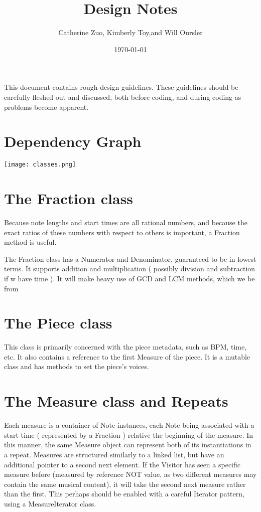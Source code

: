 \documentclass{amsart}
\begin{document}
\author{ Catherine Zuo, Kimberly Toy,and Will Oursler}
\title{Design Notes}
\date{\today}
\maketitle

This document contains rough design guidelines. These guidelines should be carefully fleshed out and discussed, both before coding, and during coding as problems become apparent.

\section{ Dependency Graph }

\texttt{[image: classes.png]}

\section{ The Fraction class }

Because note lengths and start times are all rational numbers, and because the exact ratios of these numbers with respect to others is important, a Fraction method is useful.

The Fraction class has a Numerator and Denominator, guaranteed to be in lowest terms. It supports addition and multiplication ( possibly division and subtraction if w have time ). It will make heavy use of GCD and LCM methods, which we be from %

\section{ The Piece class }

This class is primarily concerned with the piece metadata, such as BPM, time, etc. It also contains a reference to the first Measure of the piece.  It is a mutable class and has methods to set the piece's voices.  

\section{ The Measure class and Repeats }

Each measure is a container of Note instances, each Note being associated with a start time ( represented by a Fraction ) relative the beginning of the measure. In this manner, the same Measure object can represent both of its instantiations in a repeat. Measures are structured similarly to a linked list, but have an additional pointer to a second next element. If the Visitor has seen a specific measure before (measured by reference NOT value, as two different measures may contain the same musical content), it will take the second next measure rather than the first. This perhaps should be enabled with a careful Iterator pattern, using a MeasureIterator class.  
\end{document}
